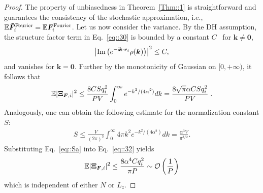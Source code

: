 \begin{proof}%
    The property of unbiasedness in Theorem~\ref{Thm::1} is straightforward and guarantees the consistency of the stochastic approximation, i.e., $\mathbb{E}\boldsymbol{ \tilde{F}}_i^{\text{Fourier}}=\mathbb{E}\boldsymbol{F}_i^{\text{Fourier}}$. 
    Let us now consider the variance.
    By the DH assumption, the structure factor term in Eq.~\eqref{eq::30} is bounded by a constant $C$~\cite{jin2021random} for $\bm{k}\neq \bm{0}$,
    \begin{equation}
        \left|\text{Im}\left(e^{-\mathsf i \boldsymbol{k}\cdot \boldsymbol{r}_i}\rho(\boldsymbol{k})\right)\right|^2\leq C,
    \end{equation}
    and vanishes for $\bm{k}=\bm{0}$. 
    Further by the monotonicity of Gaussian on $[0, +\infty )$, it follows that
    \begin{equation}\label{eq::32}
        \begin{split}
            \mathbb{E}|\V \Xi_{\V F,i}|^2\leq \frac{8 CSq_i^2}{PV}\int_{0}^{\infty}e^{-k^2/(4\alpha^2)}dk= \frac{8\sqrt{\pi}\alpha CSq_i^2}{PV}\;.%
        \end{split}
    \end{equation}
    Analogously, one can obtain the following estimate for the normalization constant $S$:
    \begin{equation}\label{eq::Sa}
        \begin{split}
            S\leq \frac{V}{(2\pi)^3}\int_{0}^{\infty}4\pi k^2e^{-k^2/(4\alpha^2)}dk=\frac{\alpha^3V}{\pi^{3/2}}.
        \end{split}
    \end{equation}
    Substituting Eq.~\eqref{eq::Sa} into Eq.~\eqref{eq::32} yields
    \begin{equation}
        \mathbb{E}|\boldsymbol{\Xi}_{\boldsymbol{F},i}|^2\leq\frac{8\alpha^4Cq_i^2}{\pi P}\sim \mathcal O\left(\frac{1}{P}\right)
    \end{equation}
    which is independent of either $N$ or $L_z$.
\end{proof}

